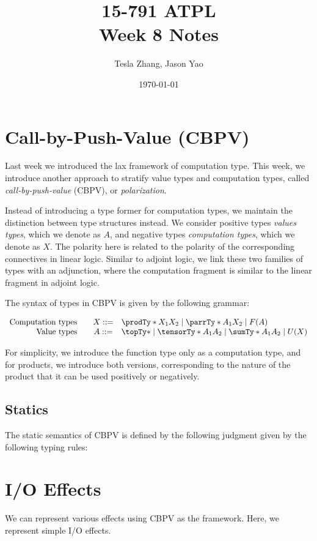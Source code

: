\documentclass[letterpaper]{article}
\title{15-791 ATPL \\ Week 8 Notes}
\author{Tesla Zhang, Jason Yao}
\date{\today}
\begin{document}
\maketitle

\section{Call-by-Push-Value (CBPV)}
Last week we introduced the lax framework of computation type.
This week, we introduce another approach to stratify value types and computation types,
called \emph{call-by-push-value} (CBPV), or \emph{polarization}.

Instead of introducing a type former for computation types,
we maintain the distinction between type structures instead.
We consider positive types \emph{values types}, which we denote as $A$,
and negative types \emph{computation types}, which we denote as $X$.
The polarity here is related to the polarity of the corresponding connectives in linear logic.
Similar to adjoint logic, we link these two families of types with an adjunction,
where the computation fragment is similar to the linear fragment in adjoint logic.

The syntax of types in CBPV is given by the following grammar:

\[
    \begin{array}{rcl}
        \text{Computation types} \quad & X ::= & \prodTy*{X_1}{X_2} \mid \parrTy*{A_1}{X_2} \mid F(A) \\
        \text{Value types} \quad       & A ::= & \topTy* \mid \tensorTy*{A_1}{A_2} \mid \sumTy*{A_1}{A_2} \mid U(X) \\
    \end{array}
\]

For simplicity, we introduce the function type only as a computation type,
and for products, we introduce both versions, corresponding to the nature of the product that
it can be used positively or negatively.

\subsection{Statics}

The static semantics of CBPV is defined by the following judgment given by the following typing rules:

\begin{mathpar}
\end{mathpar}

\section{I/O Effects}
We can represent various effects using CBPV as the framework. Here, we represent simple I/O effects.
\end{document}
